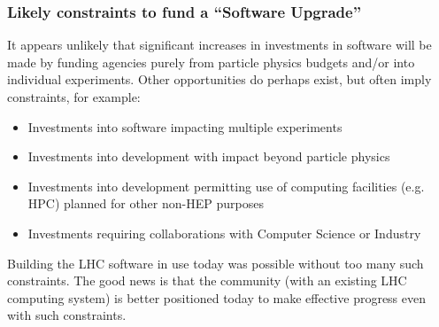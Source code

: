 \begin{frame}
\frametitle{Likely constraints to fund a ``Software Upgrade''}

It appears unlikely that significant increases in investments in software 
will be made by funding agencies purely from particle physics budgets 
and/or into individual experiments. Other opportunities do perhaps exist,
but often imply constraints, for example:

\begin{itemize}
\item Investments into software impacting multiple experiments 
\item Investments into development with impact beyond particle physics 
\item Investments into development permitting use of computing facilities (e.g. HPC) planned for other non-HEP purposes
\item Investments requiring collaborations with Computer Science or Industry
\end{itemize}

Building the LHC software in use today was possible without too many such constraints. The good news is that the community (with an existing LHC computing system) is better positioned today to make effective progress even with such constraints.

\end{frame}

